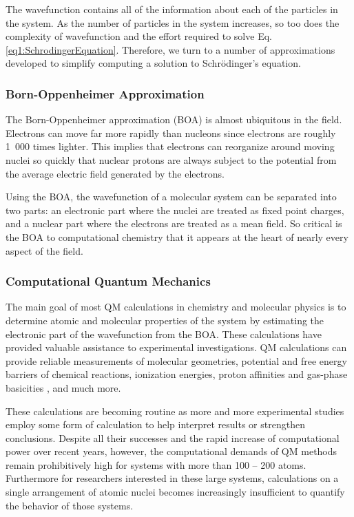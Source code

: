 The wavefunction contains all of the information about each of the particles in
the system. As the number of particles in the system increases, so too does the
complexity of wavefunction and the effort required to solve Eq.
\ref{eq1:SchrodingerEquation}. Therefore, we turn to a number of approximations
developed to simplify computing a solution to Schr\"odinger's equation.

\subsubsection{Born-Oppenheimer Approximation}

The Born-Oppenheimer approximation (BOA) is almost ubiquitous in the field.
Electrons can move far more rapidly than nucleons since electrons are roughly
\mbox{1 000} times lighter. This implies that electrons can reorganize around
moving nuclei so quickly that nuclear protons are always subject to the
potential from the average electric field generated by the electrons.

Using the BOA, the wavefunction of a molecular system can be separated into two
parts: an electronic part where the nuclei are treated as fixed point charges,
and a nuclear part where the electrons are treated as a mean field.
\cite{McQuarrie_Book_PhysChem_1997} So critical is the BOA to computational
chemistry that it appears at the heart of nearly every aspect of the field.

\subsubsection{Computational Quantum Mechanics}
\label{sec1:CompQuantumMech}

The main goal of most QM calculations in chemistry and molecular physics is to
determine atomic and molecular properties of the system by estimating the
electronic part of the wavefunction from the BOA. These calculations have
provided valuable assistance to experimental investigations. QM calculations
can provide reliable measurements of molecular geometries,
\cite{Jeletic_JOrganometChem_2011_v696_p3127} potential and free energy barriers
of chemical reactions, \cite{Chandrasekhar_JAmChemSoc_1985_v107_p154} ionization
energies, \cite{Watson_ChemPhysLett_2013_v555_p235} proton affinities and
gas-phase basicities \cite{Range_PhysChemChemPhys_2005_v7_p3070}, and much more.
\cite{Hehre_Ab_inito_MO_Theory_Book_1986}

These calculations are becoming routine as more and more experimental studies
employ some form of calculation to help interpret results or strengthen
conclusions. Despite all their successes and the rapid increase of computational
power over recent years, however, the computational demands of QM methods remain
prohibitively high for systems with more than 100 -- 200 atoms. Furthermore for
researchers interested in these large systems, calculations on a single
arrangement of atomic nuclei becomes increasingly insufficient to quantify the
behavior of those systems.

